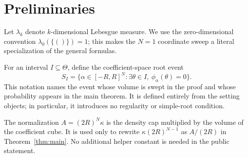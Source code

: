 \section{Preliminaries}\label{sec:preliminaries}

Let $\lambda_k$ denote $k$-dimensional Lebesgue measure.  We use the
zero-dimensional convention $\lambda_0(\{()\})=1$; this makes the
$N=1$ coordinate sweep a literal specialization of the general formulas.

For an interval $I\subseteq\Theta$, define the coefficient-space root event
\[
S_I
=\{\alpha\in[-R,R]^N:
  \exists\theta\in I,\ \phi_\alpha(\theta)=0\}.
\]
This notation names the event whose volume is swept in the proof and whose
probability appears in the main theorem.  It is defined entirely from the
setting objects; in particular, it introduces no regularity or simple-root
condition.

The normalization $A=(2R)^N\kappa$ is the density cap multiplied by the
volume of the coefficient cube.  It is used only to rewrite
$\kappa(2R)^{N-1}$ as $A/(2R)$ in Theorem~\ref{thm:main}.  No additional helper
constant is needed in the public statement.

